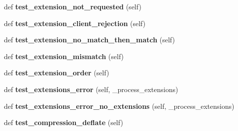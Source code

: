 \begin{DoxyCompactItemize}
def {\bfseries test\+\_\+extension\+\_\+not\+\_\+requested} (self)
\item 
\mbox{\label{classwebsockets_1_1test__client__server_1_1_client_server_tests_a006860ffee7462a1948f8121f88476cb}} 
def {\bfseries test\+\_\+extension\+\_\+client\+\_\+rejection} (self)
\item 
\mbox{\label{classwebsockets_1_1test__client__server_1_1_client_server_tests_ab00038a4f4305971b2389536ac0d6492}} 
def {\bfseries test\+\_\+extension\+\_\+no\+\_\+match\+\_\+then\+\_\+match} (self)
\item 
\mbox{\label{classwebsockets_1_1test__client__server_1_1_client_server_tests_a8c90cec03f98432318d782b246931e47}} 
def {\bfseries test\+\_\+extension\+\_\+mismatch} (self)
\item 
\mbox{\label{classwebsockets_1_1test__client__server_1_1_client_server_tests_a67350a51a0c253b8f7332aa025eedae2}} 
def {\bfseries test\+\_\+extension\+\_\+order} (self)
\item 
\mbox{\label{classwebsockets_1_1test__client__server_1_1_client_server_tests_ac442e30b4a1d99e2f4a53400f1aed7f2}} 
def {\bfseries test\+\_\+extensions\+\_\+error} (self, \+\_\+process\+\_\+extensions)
\item 
\mbox{\label{classwebsockets_1_1test__client__server_1_1_client_server_tests_a5441aba4db9d7b31997bda421021f9ab}} 
def {\bfseries test\+\_\+extensions\+\_\+error\+\_\+no\+\_\+extensions} (self, \+\_\+process\+\_\+extensions)
\item 
\mbox{\label{classwebsockets_1_1test__client__server_1_1_client_server_tests_a222df2b0b25e401107c451cd85b82e76}} 
def {\bfseries test\+\_\+compression\+\_\+deflate} (self)
\item 
\mbox{\label{classwebsockets_1_1test__client__server_1_1_client_server_tests_a0861ad18b373c00b3babf1fb5f0092df}} 

\end{DoxyCompactItemize}
